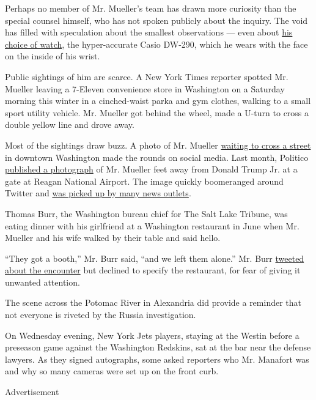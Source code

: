 Perhaps no member of Mr. Mueller's team has drawn more curiosity than
the special counsel himself, who has not spoken publicly about the
inquiry. The void has filled with speculation about the smallest
observations --- even about
\href{https://www.newyorker.com/culture/on-and-off-the-avenue/robert-mueller-style-icon}{his
choice of watch}, the hyper-accurate Casio DW-290, which he wears with
the face on the inside of his wrist.

Public sightings of him are scarce. A New York Times reporter spotted
Mr. Mueller leaving a 7-Eleven convenience store in Washington on a
Saturday morning this winter in a cinched-waist parka and gym clothes,
walking to a small sport utility vehicle. Mr. Mueller got behind the
wheel, made a U-turn to cross a double yellow line and drove away.

Most of the sightings draw buzz. A photo of Mr. Mueller
\href{https://twitter.com/aaronjschaffer/status/971812608717225984?s=21}{waiting
to cross a street} in downtown Washington made the rounds on social
media. Last month, Politico
\href{https://www.politico.com/story/2018/07/27/robert-mueller-trump-jr-picture-dca-airport-745144}{published
a photograph} of Mr. Mueller feet away from Donald Trump Jr. at a gate
at Reagan National Airport. The image quickly boomeranged around Twitter
and
\href{https://www.nytimes3xbfgragh.onion/2018/07/27/us/politics/donald-trump-jr-mueller-airport.html}{was
picked up by many news outlets}.

Thomas Burr, the Washington bureau chief for The Salt Lake Tribune, was
eating dinner with his girlfriend at a Washington restaurant in June
when Mr. Mueller and his wife walked by their table and said hello.

``They got a booth,'' Mr. Burr said, ``and we left them alone.'' Mr.
Burr
\href{https://twitter.com/thomaswburr/status/1012855246937317378}{tweeted
about the encounter} but declined to specify the restaurant, for fear of
giving it unwanted attention.

The scene across the Potomac River in Alexandria did provide a reminder
that not everyone is riveted by the Russia investigation.

On Wednesday evening, New York Jets players, staying at the Westin
before a preseason game against the Washington Redskins, sat at the bar
near the defense lawyers. As they signed autographs, some asked
reporters who Mr. Manafort was and why so many cameras were set up on
the front curb.

Advertisement


